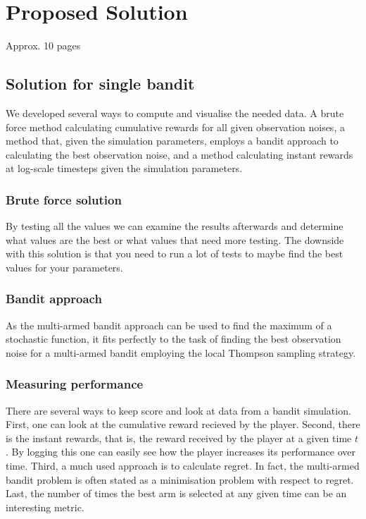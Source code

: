 \chapter{Proposed Solution}
\label{ch:solution}
Approx. 10 pages

\section{Solution for single bandit}

We developed several ways to compute and visualise the needed data. A brute
force method calculating cumulative rewards for all given observation noises, a
method that, given the simulation parameters, employs a bandit approach to
calculating the best observation noise, and a method calculating instant
rewards at log-scale timesteps given the simulation parameters.

\subsection{Brute force solution}

By testing all the values we can examine the results afterwards and determine what
values are the best or what values that need more testing. The downside with this solution
is that you need to run a lot of tests to maybe find the best values for your
parameters.

\subsection{Bandit approach}

As the multi-armed bandit approach can be used to find the maximum of a
stochastic function, it fits perfectly to the task of finding the best
observation noise for a multi-armed bandit employing the local Thompson
sampling strategy.

\subsection{Measuring performance}

There are several ways to keep score and look at data from a bandit simulation.
First, one can look at the cumulative reward recieved by the player.
Second, there is the instant rewards, that is, the reward received by the player at a given time $t$.
By logging this one can easily see how the player increases its performance over time.
Third, a much used approach is to calculate regret.
In fact, the multi-armed bandit problem is often stated as a minimisation problem with respect to regret.
Last, the number of times the best arm is selected at any given time can be an interesting metric.


